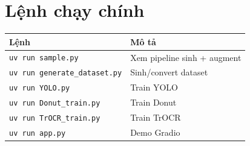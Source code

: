 \documentclass[a4paper,12pt]{report}
\begin{document}
\section{Lệnh chạy chính}
\begin{table}[H]
  \centering
  \begin{tabular}{ll}
    \toprule
    \textbf{Lệnh} & \textbf{Mô tả} \\
    \midrule
    \texttt{uv run sample.py} & Xem pipeline sinh + augment \\
    \texttt{uv run generate\_dataset.py} & Sinh/convert dataset \\
    \texttt{uv run YOLO.py} & Train YOLO \\
    \texttt{uv run Donut\_train.py} & Train Donut \\
    \texttt{uv run TrOCR\_train.py} & Train TrOCR \\
    \texttt{uv run app.py} & Demo Gradio \\
    \bottomrule
  \end{tabular}
\end{table}
\end{document}
